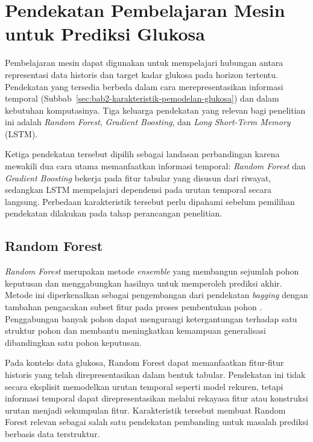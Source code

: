 \section{Pendekatan Pembelajaran Mesin untuk Prediksi Glukosa}
\label{sec:bab2-pendekatan-ml-prediksi-glukosa}

Pembelajaran mesin dapat digunakan untuk mempelajari hubungan antara representasi data historis dan target kadar glukosa pada horizon tertentu. Pendekatan yang tersedia
berbeda dalam cara merepresentasikan informasi temporal (Subbab~\ref{sec:bab2-karakteristik-pemodelan-glukosa}) dan dalam kebutuhan komputasinya. Tiga keluarga
pendekatan yang relevan bagi penelitian ini adalah \textit{Random Forest}, \textit{Gradient Boosting}, dan \textit{Long Short-Term Memory} (LSTM).

Ketiga pendekatan tersebut dipilih sebagai landasan perbandingan karena mewakili dua cara utama memanfaatkan informasi temporal: \textit{Random Forest} dan \textit{Gradient
Boosting} bekerja pada fitur tabular yang disusun dari riwayat, sedangkan LSTM mempelajari dependensi pada urutan temporal secara langsung. Perbedaan karakteristik 
tersebut perlu dipahami sebelum pemilihan pendekatan dilakukan pada tahap perancangan penelitian.

\subsection{Random Forest}
\label{subsec:bab2-random-forest}

\textit{Random Forest} merupakan metode \textit{ensemble} yang membangun sejumlah pohon keputusan dan menggabungkan hasilnya untuk memperoleh prediksi akhir. Metode ini 
diperkenalkan sebagai pengembangan dari pendekatan \textit{bagging} dengan tambahan pengacakan subset fitur pada proses pembentukan pohon \parencite{breiman2001}. 
Penggabungan banyak pohon dapat mengurangi ketergantungan terhadap satu struktur pohon dan membantu meningkatkan kemampuan generalisasi dibandingkan satu pohon keputusan.

Pada konteks data glukosa, Random Forest dapat memanfaatkan fitur-fitur historis yang telah direpresentasikan dalam bentuk tabular. Pendekatan ini tidak secara eksplisit 
memodelkan urutan temporal seperti model rekuren, tetapi informasi temporal dapat direpresentasikan melalui rekayasa fitur atau konstruksi urutan menjadi sekumpulan fitur. 
Karakteristik tersebut membuat Random Forest relevan sebagai salah satu pendekatan pembanding untuk masalah prediksi berbasis data terstruktur.

